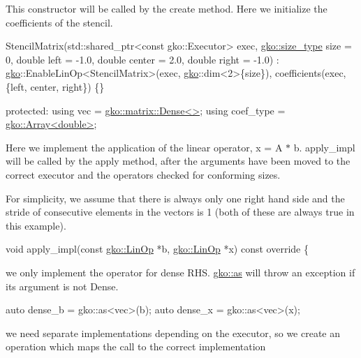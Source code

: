 This constructor will be called by the create method. Here we initialize the coefficients of the stencil.


\begin{DoxyCode}
    StencilMatrix(std::shared\_ptr<const gko::Executor> exec,
                  \hyperlink{namespacegko_a6e5c95df0ae4e47aab2f604a22d98ee7}{gko::size\_type} size = 0, \textcolor{keywordtype}{double} left = -1.0,
                  \textcolor{keywordtype}{double} center = 2.0, \textcolor{keywordtype}{double} right = -1.0)
        : \hyperlink{namespacegko}{gko}::EnableLinOp<StencilMatrix>(exec, \hyperlink{namespacegko}{gko}::dim<2>\{size\}),
          coefficients(exec, \{left, center, right\})
    \{\}

\textcolor{keyword}{protected}:
    \textcolor{keyword}{using} vec = \hyperlink{classgko_1_1matrix_1_1Dense}{gko::matrix::Dense<>};
    \textcolor{keyword}{using} coef\_type = \hyperlink{classgko_1_1Array}{gko::Array<double>};
\end{DoxyCode}


Here we implement the application of the linear operator, x = A $\ast$ b. apply\+\_\+impl will be called by the apply method, after the arguments have been moved to the correct executor and the operators checked for conforming sizes.

For simplicity, we assume that there is always only one right hand side and the stride of consecutive elements in the vectors is 1 (both of these are always true in this example).


\begin{DoxyCode}
\textcolor{keywordtype}{void} apply\_impl(\textcolor{keyword}{const} \hyperlink{classgko_1_1LinOp}{gko::LinOp} *b, \hyperlink{classgko_1_1LinOp}{gko::LinOp} *x)\textcolor{keyword}{ const override}
\textcolor{keyword}{}\{
\end{DoxyCode}


we only implement the operator for dense R\+HS. \hyperlink{namespacegko_a73ce7e87aec389b5210630bb617b4baa}{gko\+::as} will throw an exception if its argument is not Dense.


\begin{DoxyCode}
\textcolor{keyword}{auto} dense\_b = gko::as<vec>(b);
\textcolor{keyword}{auto} dense\_x = gko::as<vec>(x);
\end{DoxyCode}


we need separate implementations depending on the executor, so we create an operation which maps the call to the correct implementation


